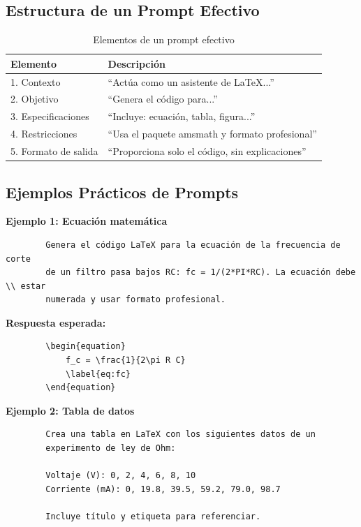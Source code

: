 \documentclass[11pt,letterpaper]{article}
\begin{document}
\subsection{Estructura de un Prompt Efectivo}

\begin{table}[H]
	\centering
	\begin{tabular}{@{}p{}p{}@{}}
		\toprule
		\textbf{Elemento} & \textbf{Descripción} \\
		\midrule
		1. Contexto & ``Actúa como un asistente de \LaTeX...'' \\
		2. Objetivo & ``Genera el código para...'' \\
		3. Especificaciones & ``Incluye: ecuación, tabla, figura...'' \\
		4. Restricciones & ``Usa el paquete amsmath y formato profesional'' \\
		5. Formato de salida & ``Proporciona solo el código, sin explicaciones'' \\
		\bottomrule
	\end{tabular}
	\caption{Elementos de un prompt efectivo}
	\label{tab:prompt}
\end{table}

\subsection{Ejemplos Prácticos de Prompts}

\begin{cajaejemplo}
	\textbf{Ejemplo 1: Ecuación matemática}
	\begin{verbatim}
		Genera el código LaTeX para la ecuación de la frecuencia de corte 
		de un filtro pasa bajos RC: fc = 1/(2*PI*RC). La ecuación debe \\ estar 
		numerada y usar formato profesional.
	\end{verbatim}
	
	\textbf{Respuesta esperada:}
	\begin{lstlisting}
		\begin{equation}
			f_c = \frac{1}{2\pi R C}
			\label{eq:fc}
		\end{equation}
	\end{lstlisting}
\end{cajaejemplo}

\begin{cajaejemplo}
	\textbf{Ejemplo 2: Tabla de datos}
	\begin{verbatim}
		Crea una tabla en LaTeX con los siguientes datos de un 
		experimento de ley de Ohm:
		
		Voltaje (V): 0, 2, 4, 6, 8, 10
		Corriente (mA): 0, 19.8, 39.5, 59.2, 79.0, 98.7
		
		Incluye título y etiqueta para referenciar.
	\end{verbatim}
\end{cajaejemplo}
\end{document}

